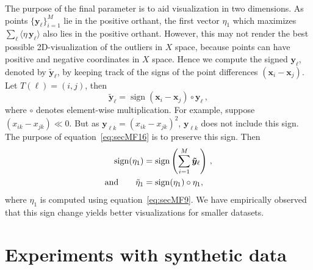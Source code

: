 \documentclass[letter,12pt]{article}
\DeclareMathOperator{\sign}{sign}
\begin{document}
The purpose of the final parameter is to aid visualization in two dimensions. As points $\{\bm{y}_{\ell}\}_{i=1}^M$ lie in the positive orthant, the first vector $\eta_1$ which maximizes $\sum_\ell \langle \eta\, \bm{y}_\ell\rangle$ also lies in the positive orthant. However, this may not render the best possible 2D-visualization of the outliers in $X$ space, because points can have positive and negative coordinates in $X$ space. Hence we compute the signed $\bm{y}_{\ell}$, denoted by $\bm{\tilde{y}}_\ell$, by keeping track of the signs of the point differences $(\bm{x}_i - \bm{x}_j)$. Let $T(\ell) = (i, j)$, then
\begin{equation}\label{eq:secMF16}
	\bm{\tilde{y}}_\ell = \sign(\bm{x}_i - \bm{x}_j) \circ \bm{y}_{\ell} \, ,
\end{equation}
where $\circ$ denotes element-wise multiplication. {\color{blue} For example, suppose $({x}_{ik} - {x}_{jk}) \ll 0 $. But as $ \bm{y}_{\ell k} = ({x}_{ik} - {x}_{jk})^2$, $\bm{y}_{\ell k} $ does not include this sign. The purpose of equation~\eqref{eq:secMF16} is to preserve this sign. }  Then
\begin{align}\label{eq:secMF17}
	\sign(\eta_1) & = \sign \left( \sum_{i=1}^M \bm{\tilde{y}}_\ell \right) \, , \notag \\
	\text{and}\qquad
  \tilde\eta_1  & = \sign (\eta_1) \circ \eta_1,
\end{align}
where $\eta_1 $ is computed using equation~\eqref{eq:secMF9}. {\color{blue}  We have empirically observed that this sign change yields better visualizations for smaller datasets. }
 

\section{Experiments with synthetic data}\label{sec:synthetic}
\end{document}

